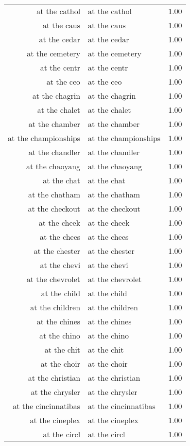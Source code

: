 \begin{table}[ht]
\begin{tabular}{rlr}
  at the cathol & at the cathol & 1.00 \\ 
  at the caus & at the caus & 1.00 \\ 
  at the cedar & at the cedar & 1.00 \\ 
  at the cemetery & at the cemetery & 1.00 \\ 
  at the centr & at the centr & 1.00 \\ 
  at the ceo & at the ceo & 1.00 \\ 
  at the chagrin & at the chagrin & 1.00 \\ 
  at the chalet & at the chalet & 1.00 \\ 
  at the chamber & at the chamber & 1.00 \\ 
  at the championships & at the championships & 1.00 \\ 
  at the chandler & at the chandler & 1.00 \\ 
  at the chaoyang & at the chaoyang & 1.00 \\ 
  at the chat & at the chat & 1.00 \\ 
  at the chatham & at the chatham & 1.00 \\ 
  at the checkout & at the checkout & 1.00 \\ 
  at the cheek & at the cheek & 1.00 \\ 
  at the chees & at the chees & 1.00 \\ 
  at the chester & at the chester & 1.00 \\ 
  at the chevi & at the chevi & 1.00 \\ 
  at the chevrolet & at the chevrolet & 1.00 \\ 
  at the child & at the child & 1.00 \\ 
  at the children & at the children & 1.00 \\ 
  at the chines & at the chines & 1.00 \\ 
  at the chino & at the chino & 1.00 \\ 
  at the chit & at the chit & 1.00 \\ 
  at the choir & at the choir & 1.00 \\ 
  at the christian & at the christian & 1.00 \\ 
  at the chrysler & at the chrysler & 1.00 \\ 
  at the cincinnatibas & at the cincinnatibas & 1.00 \\ 
  at the cineplex & at the cineplex & 1.00 \\ 
  at the circl & at the circl & 1.00 \\ 

\end{tabular}
\end{table}
